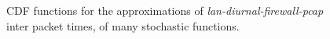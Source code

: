 \begin{figure}[ht!]
{	}
	\hspace{0mm}
	\caption{CDF functions for the approximations of \textit{lan-diurnal-firewall-pcap} inter  packet times, of many stochastic functions.}
\end{figure}

\clearpage

